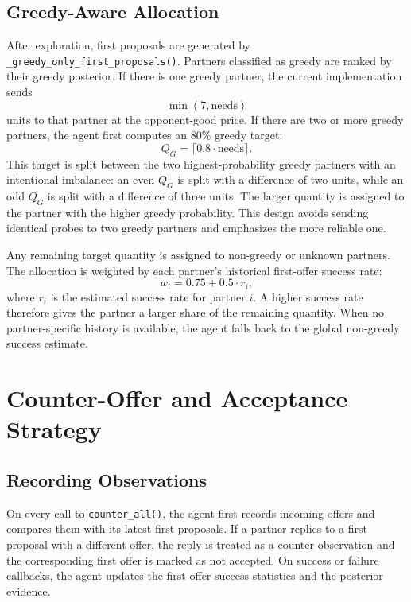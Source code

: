 \documentclass[11pt]{article}
\begin{document}
\subsection{Greedy-Aware Allocation}

After exploration, first proposals are generated by
\texttt{\_greedy\_only\_first\_proposals()}.  Partners classified as greedy are
ranked by their greedy posterior.  If there is one greedy partner, the current
implementation sends
\[
  \min(7, \text{needs})
\]
units to that partner at the opponent-good price.  If there are two or more
greedy partners, the agent first computes an \(80\%\) greedy target:
\[
  Q_G = \lceil 0.8 \cdot \text{needs} \rceil.
\]
This target is split between the two highest-probability greedy partners with
an intentional imbalance: an even \(Q_G\) is split with a difference of two
units, while an odd \(Q_G\) is split with a difference of three units.  The
larger quantity is assigned to the partner with the higher greedy probability.
This design avoids sending identical probes to two greedy partners and
emphasizes the more reliable one.

Any remaining target quantity is assigned to non-greedy or unknown partners.
The allocation is weighted by each partner's historical first-offer success
rate:
\[
  w_i = 0.75 + 0.5 \cdot r_i,
\]
where \(r_i\) is the estimated success rate for partner \(i\).  A higher
success rate therefore gives the partner a larger share of the remaining
quantity.  When no partner-specific history is available, the agent falls back
to the global non-greedy success estimate.

\section{Counter-Offer and Acceptance Strategy}

\subsection{Recording Observations}

On every call to \texttt{counter\_all()}, the agent first records incoming
offers and compares them with its latest first proposals.  If a partner replies
to a first proposal with a different offer, the reply is treated as a counter
observation and the corresponding first offer is marked as not accepted.  On
success or failure callbacks, the agent updates the first-offer success
statistics and the posterior evidence.
\end{document}
